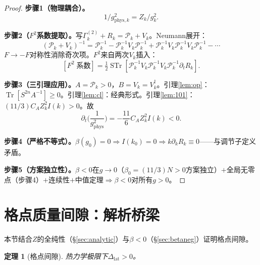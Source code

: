 \documentclass[12pt,a4paper]{article}
\theoremstyle{plain}
\newtheorem{theorem}{定理}[section]
\theoremstyle{definition}
\theoremstyle{remark}
\begin{document}
\begin{proof}
\textbf{步骤1（物理耦合）。}
\begin{equation}\label{eq:gphys}
1/g_{\mathrm{phys},k}^2 = Z_k/g_k^2.
\end{equation}

\textbf{步骤2（$F^2$系数提取）。}写$\Gamma_k^{(2)}+R_k=\mathcal{P}_k+V_k$。Neumann展开：
\begin{equation}\label{eq:Neumann}
(\mathcal{P}_k+V_k)^{-1} = \mathcal{P}_k^{-1}-\mathcal{P}_k^{-1}V_k\mathcal{P}_k^{-1}+\mathcal{P}_k^{-1}V_k\mathcal{P}_k^{-1}V_k\mathcal{P}_k^{-1}-\cdots
\end{equation}
$F\to -F$对称性消除奇次项。$F^2$来自两次$V_k$插入：
\begin{equation}\label{eq:F2trace}
[F^2\;\text{系数}] = \tfrac{1}{2}\operatorname{STr}[\mathcal{P}_k^{-1}V_k\mathcal{P}_k^{-1}V_k\mathcal{P}_k^{-1}\partial_tR_k].
\end{equation}

\textbf{步骤3（三引理应用）。}$A=\mathcal{P}_k>0$，$B=V_k=V_k^\dagger$。引理\ref{lem:op}：$\operatorname{Tr}[S^{2n}A^{-1}]\geq 0$。引理\ref{lem:cl}：经典形式。引理\ref{lem:101}：$(11/3)C_AZ_k^2I(k)>0$。故
\begin{equation}\label{eq:betaflow}
\partial_t\!\Big(\frac{1}{g_{\mathrm{phys}}^2}\Big) = -\frac{11}{6}C_AZ_k^2I(k) < 0.
\end{equation}

\textbf{步骤4（严格不等式）。}$\beta(g_0)=0\Rightarrow I(k_0)=0\Rightarrow k\partial_kR_k\equiv 0$——与调节子定义矛盾。

\textbf{步骤5（方案独立性）。}$\beta<0$在$g\to 0$（$\beta_0=(11/3)N>0$方案独立）$+$全局无零点（步骤4）$+$连续性$+$中值定理$\Rightarrow\beta<0$对所有$g>0$。
\end{proof}


\section{格点质量间隙：解析桥梁}\label{sec:latgap}

本节结合$Z$的全纯性（\S\ref{sec:analytic}）与$\beta<0$（\S\ref{sec:betaneg}）证明格点间隙。

\begin{theorem}[格点间隙]\label{thm:latgap}
热力学极限下$\Delta_{\mathrm{lat}}>0$。
\end{theorem}
\end{document}
